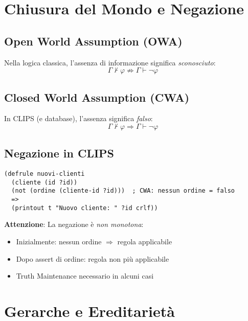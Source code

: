 \section{Chiusura del Mondo e Negazione}

\subsection{Open World Assumption (OWA)}

Nella logica classica, l'assenza di informazione significa \textit{sconosciuto}:
\begin{equation}
\Gamma \not\vdash \varphi \not\Rightarrow \Gamma \vdash \neg \varphi
\end{equation}

\subsection{Closed World Assumption (CWA)}

In CLIPS (e database), l'assenza significa \textit{falso}:
\begin{equation}
\Gamma \not\vdash \varphi \Rightarrow \Gamma \vdash \neg \varphi
\end{equation}

\subsection{Negazione in CLIPS}

\begin{lstlisting}[language=CLIPS]
(defrule nuovi-clienti
  (cliente (id ?id))
  (not (ordine (cliente-id ?id)))  ; CWA: nessun ordine = falso
  =>
  (printout t "Nuovo cliente: " ?id crlf))
\end{lstlisting}

\textbf{Attenzione}: La negazione è \textit{non monotona}:
\begin{itemize}
\item Inizialmente: nessun ordine $\Rightarrow$ regola applicabile
\item Dopo assert di ordine: regola non più applicabile
\item Truth Maintenance necessario in alcuni casi
\end{itemize}

\section{Gerarche e Ereditarietà}

